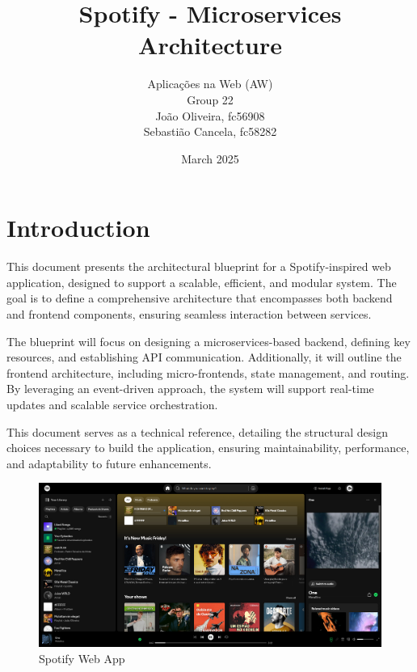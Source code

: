 \documentclass[a4paper,12pt]{article}
\title{Spotify - Microservices Architecture}
\author{
    Aplicações na Web (AW) \\
    Group 22 \\[0.3cm]
    João Oliveira, fc56908 \\ 
    Sebastião Cancela, fc58282
}
\date{March 2025}
\begin{document}
\maketitle
\tableofcontents
\newpage

\section{Introduction}

This document presents the architectural blueprint for a Spotify-inspired web application, designed to support a scalable, efficient, and modular system. The goal is to define a comprehensive architecture that encompasses both backend and frontend components, ensuring seamless interaction between services.

The blueprint will focus on designing a microservices-based backend, defining key resources, and establishing API communication. Additionally, it will outline the frontend architecture, including micro-frontends, state management, and routing. By leveraging an event-driven approach, the system will support real-time updates and scalable service orchestration.

This document serves as a technical reference, detailing the structural design choices necessary to build the application, ensuring maintainability, performance, and adaptability to future enhancements.

\begin{figure}[H]
    \centering
    \includegraphics[width=\linewidth]{images/a.png}
    \caption{Spotify Web App}
    \label{fig:spotify-web-app}
\end{figure}
\end{document}
